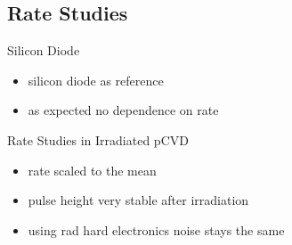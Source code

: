 \subsection{Rate Studies}
\begin{frame}{Silicon Diode}

	
	\begin{itemize}\itemfill
		\item silicon diode as reference 
		\item as expected no dependence on rate
	\end{itemize}
	
\end{frame}
%  
% 	
%  
\begin{frame}{Rate Studies in Irradiated pCVD}

	\vspace*{-15pt}
	
	\begin{itemize}\itemfill
		\item rate scaled to the mean
		\item pulse height very stable after irradiation
		\item using rad hard electronics \ra noise stays the same
	\end{itemize}

\end{frame}
